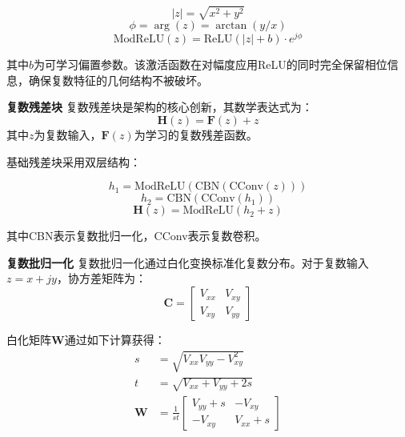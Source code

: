 \documentclass[conference]{IEEEtran}
\begin{document}
\begin{equation}
|z| = \sqrt{x^2 + y^2}
\end{equation}
\begin{equation}
\phi = \arg(z) = \arctan(y/x)
\end{equation}
\begin{equation}
\text{ModReLU}(z) = \text{ReLU}(|z| + b) \cdot e^{j\phi}
\end{equation}


其中$b$为可学习偏置参数。该激活函数在对幅度应用ReLU的同时完全保留相位信息，确保复数特征的几何结构不被破坏。

\textbf{复数残差块} 复数残差块是架构的核心创新，其数学表达式为：
\begin{equation}
\mathbf{H}(z) = \mathbf{F}(z) + z
\end{equation}
其中$z$为复数输入，$\mathbf{F}(z)$为学习的复数残差函数。

基础残差块采用双层结构：

\begin{equation}
h_1 = \text{ModReLU}(\text{CBN}(\text{CConv}(z)))
\end{equation}
\begin{equation}
h_2 = \text{CBN}(\text{CConv}(h_1))
\end{equation}
\begin{equation}
\mathbf{H}(z) = \text{ModReLU}(h_2 + z)
\end{equation}


其中CBN表示复数批归一化，CConv表示复数卷积。

\textbf{复数批归一化} 复数批归一化通过白化变换标准化复数分布。对于复数输入$z = x + jy$，协方差矩阵为：
\begin{equation}
\mathbf{C} = \begin{bmatrix} V_{xx} & V_{xy} \\ V_{xy} & V_{yy} \end{bmatrix}
\end{equation}

白化矩阵$\mathbf{W}$通过如下计算获得：
\begin{align}
s &= \sqrt{V_{xx}V_{yy} - V_{xy}^2} \\
t &= \sqrt{V_{xx} + V_{yy} + 2s} \\
\mathbf{W} &= \frac{1}{st}\begin{bmatrix} V_{yy} + s & -V_{xy} \\ -V_{xy} & V_{xx} + s \end{bmatrix}
\end{align}
\end{document}
